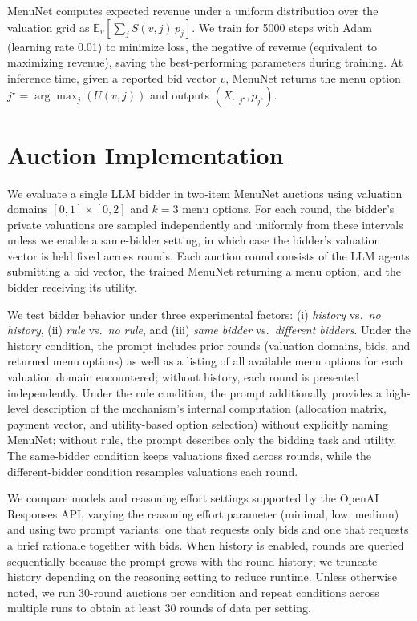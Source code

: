 \documentclass[a4paper]{article}
\begin{document}
MenuNet computes expected revenue under a uniform distribution over the valuation grid as $\mathbb{E}_{v}\left[\sum_j S(v,j)\,p_j\right]$. We train for 5000 steps with Adam (learning rate 0.01) to minimize loss, the negative of revenue (equivalent to maximizing revenue), saving the best-performing parameters during training. At inference time, given a reported bid vector $v$, MenuNet returns the menu option $j^\star=\arg\max_j (U(v,j))$ and outputs $(X_{:,j^\star}, p_{j^\star})$.



\section{Auction Implementation}

We evaluate a single LLM bidder in two-item MenuNet auctions using valuation domains $[0,1] \times [0,2]$ and $k=3$ menu options. For each round, the bidder's private valuations are sampled independently and uniformly from these intervals unless we enable a same-bidder setting, in which case the bidder's valuation vector is held fixed across rounds. Each auction round consists of the LLM agents submitting a bid vector, the trained MenuNet returning a menu option, and the bidder receiving its utility.

We test bidder behavior under three experimental factors: (i) \emph{history} vs.\ \emph{no history}, (ii) \emph{rule} vs.\ \emph{no rule}, and (iii) \emph{same bidder} vs.\ \emph{different bidders}. Under the history condition, the prompt includes prior rounds (valuation domains, bids, and returned menu options) as well as a listing of all available menu options for each valuation domain encountered; without history, each round is presented independently. Under the rule condition, the prompt additionally provides a high-level description of the mechanism's internal computation (allocation matrix, payment vector, and utility-based option selection) without explicitly naming MenuNet; without rule, the prompt describes only the bidding task and utility. The same-bidder condition keeps valuations fixed across rounds, while the different-bidder condition resamples valuations each round.

We compare models and reasoning effort settings supported by the OpenAI Responses API, varying the reasoning effort parameter (minimal, low, medium) and using two prompt variants: one that requests only bids and one that requests a brief rationale together with bids. When history is enabled, rounds are queried sequentially because the prompt grows with the round history; we truncate history depending on the reasoning setting to reduce runtime. Unless otherwise noted, we run 30-round auctions per condition and repeat conditions across multiple runs to obtain at least 30 rounds of data per setting.
\end{document}
